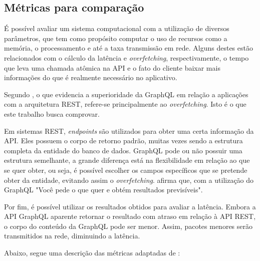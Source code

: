 \documentclass[conference]{IEEEtran}
\begin{document}
\subsection{Métricas para comparação}
\label{subsec:metricas}

É possível avaliar um sistema computacional com a utilização de diversos parâmetros, que tem como propósito computar o uso de recursos como a memória, o processamento e até a taxa transmissão em rede. Alguns destes estão relacionados com o cálculo da latência e \textit{overfetching}, respectivamente, o tempo que leva uma chamada atômica na API e o fato do cliente baixar mais informações do que é realmente necessário no aplicativo.

Segundo \cite{graphql:2019}, o que evidencia a superioridade da GraphQL em relação a aplicações com a arquitetura REST, refere-se principalmente ao \textit{overfetching}. Isto é o que este trabalho busca comprovar.

Em sistemas REST, \textit{endpoints} são utilizados para obter uma certa informação da API. Eles possuem o corpo de retorno padrão, muitas vezes sendo a estrutura completa da entidade do banco de dados. GraphQL pode ou não possuir uma estrutura semelhante, a grande diferença está na flexibilidade em relação ao que se quer obter, ou seja, é possível escolher os campos específicos que se pretende obter da entidade, evitando assim o \textit{overfetching}. \cite{graphql:2019} afirma que, com a utilização do GraphQL "Você pede o que quer e obtém resultados previsíveis".

Por fim, é possível utilizar os resultados obtidos para avaliar a latência. Embora a API GraphQL aparente retornar o resultado com atraso em relação à API REST, o corpo do conteúdo da GraphQL pode ser menor. Assim, pacotes menores serão transmitidos na rede, diminuindo a latência. 

Abaixo, segue uma descrição das métricas adaptadas de \cite{kleiman:2018}:
\end{document}
